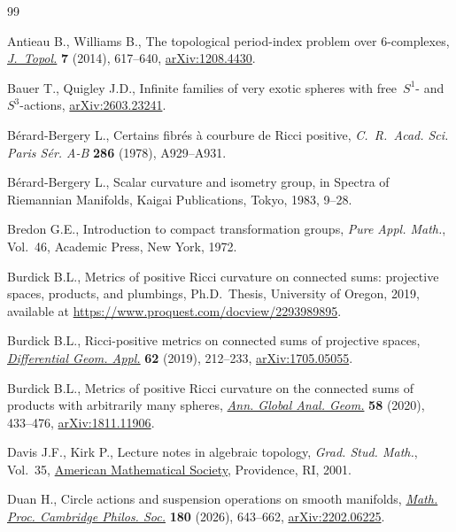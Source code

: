 \documentclass[10pt,a4paper]{amsart}
\numberwithin{equation}{section}
\theoremstyle{definition}
\numberwithin{table}{section}
\begin{document}
\begin{thebibliography}{99}
\footnotesize\itemsep=0pt

Antieau B., Williams B., The topological period-index problem over 6-complexes,
  \href{https://doi.org/10.1112/jtopol/jtt042}{\textit{J.~Topol.}} \textbf{7}
  (2014), 617--640, \href{https://arxiv.org/abs/1208.4430}{arXiv:1208.4430}.

Bauer T., Quigley J.D., Infinite families of very exotic spheres with
  free~${S}^1$- and~${S}^3$-actions,
  \href{https://arxiv.org/abs/2603.23241}{arXiv:2603.23241}.

B\'erard-Bergery L., Certains fibr\'es \`a courbure de {R}icci positive,
  \textit{C.~R.~Acad. Sci. Paris S\'er. A-B} \textbf{286} (1978), A929--A931.

B\'erard-Bergery L., Scalar curvature and isometry group, in Spectra of
  Riemannian Manifolds, Kaigai Publications, Tokyo, 1983, 9--28.

Bredon G.E., Introduction to compact transformation groups, \textit{Pure Appl.
  Math.}, Vol.~46, Academic Press, New York, 1972.

Burdick B.L., Metrics of positive {R}icci curvature on connected sums:
  projective spaces, products, and plumbings, Ph.D.~Thesis, {U}niversity of
  Oregon, 2019, available at \url{https://www.proquest.com/docview/2293989895}.

Burdick B.L., Ricci-positive metrics on connected sums of projective spaces,
  \href{https://doi.org/10.1016/j.difgeo.2018.11.005}{\textit{Differential
  Geom. Appl.}} \textbf{62} (2019), 212--233,
  \href{https://arxiv.org/abs/1705.05055}{arXiv:1705.05055}.

Burdick B.L., Metrics of positive {R}icci curvature on the connected sums of
  products with arbitrarily many spheres,
  \href{https://doi.org/10.1007/s10455-020-09732-7}{\textit{Ann. Global Anal.
  Geom.}} \textbf{58} (2020), 433--476,
  \href{https://arxiv.org/abs/1811.11906}{arXiv:1811.11906}.

Davis J.F., Kirk P., Lecture notes in algebraic topology, \textit{Grad. Stud.
  Math.}, Vol.~35, \href{https://doi.org/10.1090/gsm/035}{American Mathematical
  Society}, Providence, RI, 2001.

Duan H., Circle actions and suspension operations on smooth manifolds,
  \href{https://doi.org/10.1017/S0305004125101849}{\textit{Math. Proc.
  Cambridge Philos. Soc.}} \textbf{180} (2026), 643--662,
  \href{https://arxiv.org/abs/2202.06225}{arXiv:2202.06225}.


\end{thebibliography}
\end{document}
